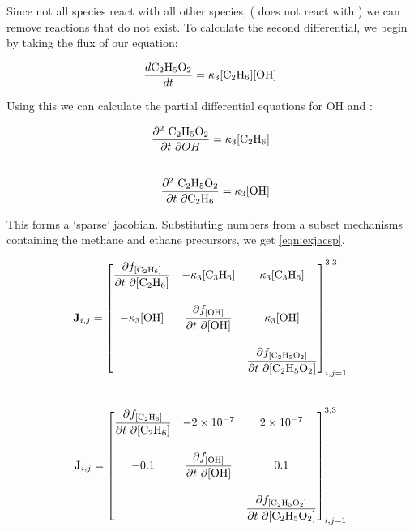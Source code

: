 Since not all species react with all other species, ( does not react with ) we can remove reactions that do not exist. To calculate the second differential, we begin by taking the flux of our equation: 

\begin{equation}
    \frac{d\ce{C2H5O2}}{dt} = \kappa_3 [\ce{C2H6}][\ce{OH}]
\end{equation}

Using this we can calculate the partial differential equations for OH and :

\begin{eqnarray}
    \frac{\partial ^2 \ \ce{C2H5O2} }{\partial t \ \partial OH} = \kappa_3 [\ce{C2H6}] \\[20pt]
    \frac{\partial ^2 \ \ce{C2H5O2} }{\partial t \ \partial \ce{C2H6}} = \kappa_3 [\ce{OH}]
\end{eqnarray}


This forms a `sparse' jacobian. Substituting numbers from a subset mechanisms containing the methane and ethane precursors, we get \autoref{eqn:exjacsp}.





\begin{eqnarray}
 \mathbf{J}_{i,j} =
\begin{bmatrix}
\dfrac{\partial f_{[\ce{C2H6}]}}{\partial t \ \partial {[\ce{C2H6}]}} &
  - \kappa_3[\ce{C3H6}] &
  \kappa_3[\ce{C3H6}] \\[20pt]
-\kappa_3[\ce{OH}] &
  \dfrac{\partial f_{[\ce{OH}]}}{\partial t \ \partial {[\ce{OH}]}} &
\kappa_3[\ce{OH}] \\[20pt]
\  &
 \  &
  \dfrac{\partial f_{[\ce{C2H5O2}]}}{\partial t \ \partial {[\ce{C2H5O2}]}}
\end{bmatrix}_{i,j=1}^{3,3}
\label{eqn:exjacsppre}
\end{eqnarray}\\



   \begin{eqnarray}
    \mathbf{J}_{i,j} =
 \begin{bmatrix}
   \dfrac{\partial f_{[\ce{C2H6}]}}{\partial t \ \partial {[\ce{C2H6}]}} &
     - 2\times 10^{-7} &
     2\times 10^{-7} \\[20pt]
   -0.1 &
     \dfrac{\partial f_{[\ce{OH}]}}{\partial t \ \partial {[\ce{OH}]}} &
  0.1 \\[20pt]
   \  &
    \  &
     \dfrac{\partial f_{[\ce{C2H5O2}]}}{\partial t \ \partial {[\ce{C2H5O2}]}}
 \end{bmatrix}_{i,j=1}^{3,3}
 \label{eqn:exjacsp}
\end{eqnarray}\\

